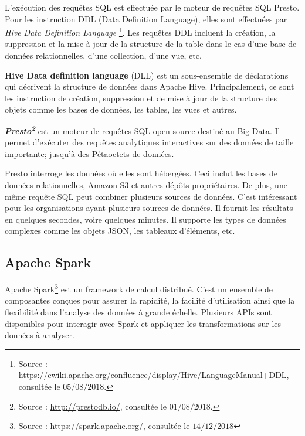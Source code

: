 L'exécution des requêtes SQL est effectuée par le moteur de requêtes SQL Presto. Pour les instruction DDL (Data Definition Language), elles sont effectuées par  \textit{Hive Data Definition Language} \footnote{Source : \url{https://cwiki.apache.org/confluence/display/Hive/LanguageManual+DDL}, consultée le $05/08/2018$.}. Les requêtes DDL incluent la création, la suppression et la mise à jour de la structure de la table dans le cas d'une base de données relationnelles, d'une collection, d'une vue, etc. 

\begin{tcolorbox}
	\textbf{Hive Data definition language} (DLL) est un sous-ensemble de déclarations qui décrivent la structure de données dans Apache Hive.  Principalement, ce sont les instruction de création, suppression et de mise à jour de la structure des objets comme les bases de données, les tables, les vues et autres.
\end{tcolorbox}

\begin{tcolorbox}
	\textbf{\textit{Presto\footnote{Source : \url{http://prestodb.io/}, consultée le $01/08/2018$.} }} est un moteur de requêtes SQL open source destiné au Big Data. Il permet d'exécuter des requêtes analytiques interactives sur des données de taille importante; jusqu'à des Pétaoctets de données.
	
	Presto interroge les données où elles sont hébergées. Ceci inclut les bases de données relationnelles, Amazon S3 et autres dépôts propriétaires. De plus, une même requête SQL peut combiner plusieurs sources de données. C'est intéressant pour les organisations ayant plusieurs sources de données. Il fournit les résultats en quelques secondes, voire quelques minutes.  Il supporte les types de données complexes comme les objets JSON, les tableaux d'éléments, etc. 
\end{tcolorbox} 




\subsection{Apache Spark } \label{apache-spark}


Apache Spark\footnote{Source : \url{https://spark.apache.org/}, consultée le $14/12/2018$} 
est un framework de calcul distribué. C'est un ensemble de composantes conçues pour assurer la rapidité, la facilité d'utilisation ainsi que la flexibilité dans l'analyse des données à grande échelle. Plusieurs APIs sont disponibles pour interagir avec Spark et 
 appliquer les transformations sur les données à analyser. 

